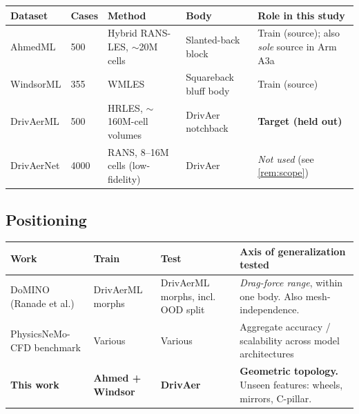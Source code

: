 \documentclass[10pt,a4paper]{article}
\theoremstyle{definition}
\begin{document}
\begin{center}\small
\begin{tabular}{@{}p{2.2cm}p{1.3cm}p{3.6cm}p{2.6cm}p{4.2cm}@{}}
\toprule
\textbf{Dataset} & \textbf{Cases} & \textbf{Method} & \textbf{Body}
& \textbf{Role in this study} \\
\midrule
AhmedML   & 500 & Hybrid RANS-LES, $\sim$20M cells & Slanted-back block
  & Train (source); also \emph{sole} source in Arm A3a \\
WindsorML & 355 & WMLES                            & Squareback bluff body
  & Train (source) \\
DrivAerML & 500 & HRLES, $\sim$160M-cell volumes   & DrivAer notchback
  & \textbf{Target (held out)} \\
\midrule
DrivAerNet & 4000 & RANS, 8--16M cells (low-fidelity) & DrivAer
  & \emph{Not used} (see \cref{rem:scope}) \\
\bottomrule
\end{tabular}
\end{center}

\subsection{Positioning}

\begin{center}\small
\begin{tabular}{@{}p{3.6cm}p{3.0cm}p{3.4cm}p{5.2cm}@{}}
\toprule
\textbf{Work} & \textbf{Train} & \textbf{Test} & \textbf{Axis of generalization tested} \\
\midrule
DoMINO (Ranade et al.) & DrivAerML morphs & DrivAerML morphs, incl. OOD split
  & \emph{Drag-force range}, within one body. Also mesh-independence. \\[0.3em]
PhysicsNeMo-CFD benchmark & Various & Various
  & Aggregate accuracy / scalability across model architectures \\[0.3em]
\textbf{This work} & \textbf{Ahmed + Windsor} & \textbf{DrivAer}
  & \textbf{Geometric topology.} Unseen features: wheels, mirrors, C-pillar. \\
\bottomrule
\end{tabular}
\end{center}
\end{document}
